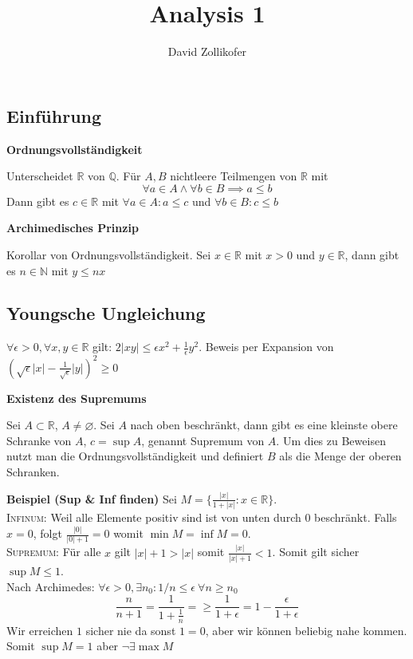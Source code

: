 \documentclass[25pt]{sciposter}
\title{\huge{Analysis 1}}
\author{\large{David Zollikofer}}
\newcommand{\Q}{\mathbb{Q}}
\newcommand{\R}{\mathbb{R}}
\newcommand{\N}{\mathbb{N}}
\newenvironment{method}[1]{\begin{mdframed}[backgroundcolor=blue!10,innertopmargin=15pt, innerbottommargin=15pt, nobreak=true]
		\textbf{#1 }
	}
	{ 
	\end{mdframed}
}
\begin{document}
\selectfont



\maketitle


\begin{multicols}{3}


\section{Einführung}
\begin{method}{Ordnungsvollständigkeit}
Unterscheidet $\R$ von $\Q$. Für $A,B$ nichtleere Teilmengen von $\R$ mit $$\forall a\in A \land \forall b \in B \implies a \leq b$$
Dann gibt es $c \in \R$ mit $\forall a \in A : a \leq c$ und $\forall b \in B : c \leq b$
\end{method}


\begin{method}{Archimedisches Prinzip}
Korollar von Ordnungsvollständigkeit. Sei $x\in \R$ mit $x>0$ und $y \in \R$, dann gibt es $n\in \N$ mit $y \leq nx$
\end{method}

\subsection*{Youngsche Ungleichung}
$\forall \epsilon > 0 , \forall x,y\in \R$ gilt: $2 |xy| \leq \epsilon x^2 + \frac{1}{\epsilon} y^2$. Beweis per Expansion von $\left( \sqrt{\epsilon} |x| - \frac{1}{\sqrt{\epsilon}} |y| \right) ^2 \geq 0$

\begin{method}{Existenz des Supremums}
Sei $A \subset \R$, $A \not = \varnothing$. Sei $A$ nach oben beschränkt, dann gibt es eine kleinste obere Schranke von $A$, $c = \sup A$, genannt Supremum von $A$. Um dies zu Beweisen nutzt man die Ordnungsvollständigkeit und definiert $B$ als die Menge der oberen Schranken.
\end{method}
\textbf{Beispiel (Sup \& Inf finden)} Sei $M = \{ \frac{|x|}{1 + |x|} : x \in \mathbb{R}\}$. \\ \textsc{Infinum:} Weil alle Elemente positiv sind ist von unten durch 0 beschränkt. Falls $x = 0$, folgt $\frac{|0|}{|0|+1} =0$ womit $\min{M} = \inf{M} = 0$. \\
\textsc{Supremum:} Für alle $x$ gilt $|x| + 1 > |x|$ somit $\frac{|x|}{|x|+1} < 1$. Somit gilt sicher $\sup M \leq 1$. \\
Nach Archimedes: $\forall \epsilon > 0,\exists n_0 : 1/n \leq \epsilon \ \forall n \geq n_0$
$$\frac{n}{n+1} = \frac{1}{1 + \frac{1}{n}} =\geq \frac{1}{1 + \epsilon} = 1 - \frac{\epsilon}{1 + \epsilon}$$
Wir erreichen $1$ sicher nie da sonst $1 = 0$, aber wir können beliebig nahe kommen. Somit $\sup M = 1$ aber $\neg \exists \max M$


\end{multicols}
\end{document}
